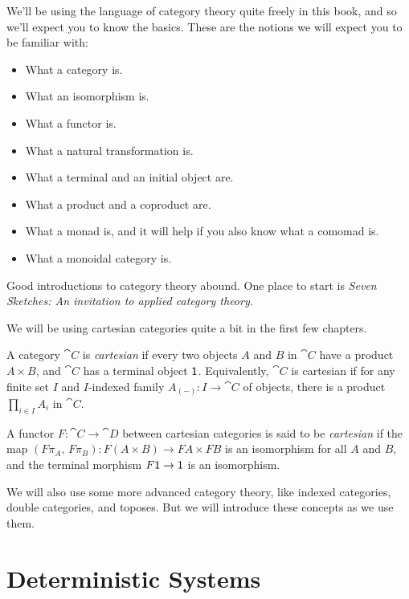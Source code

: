 \documentclass[DynamicalBook]{subfiles}
\begin{document}
We'll be using the language of category theory quite freely in this book, and so
we'll expect you to know the basics. These are the notions we will expect you to
be familiar with:
\begin{itemize}
\item What a category is.
\item What an isomorphism is.
\item What a functor is.
\item What a natural transformation is.
\item What a terminal and an initial object are.
\item What a product and a coproduct are.
\item What a monad is, and it will help if you also know what a comomad is.
  \item What a monoidal category is.
\end{itemize}

Good introductions to category theory abound. One place to start is \emph{Seven
  Sketches: An invitation to applied category theory}.

We will be using cartesian categories quite a bit in the first few chapters.
\begin{definition}\label{def.cartesian_category}
  A category $\cat{C}$ is \emph{cartesian} if every two objects $A$ and $B$ in
  $\cat{C}$ have a product $A \times B$, and $\cat{C}$ has a terminal object
  $\mathsf{1}$. Equivalently, $\cat{C}$ is cartesian if for any finite set $I$ and
  $I$-indexed family $A_{(-)} : I \to \cat{C}$ of objects, there is a product
  $\prod_{i \in I} A_i$ in $\cat{C}$.

  A functor $F : \cat{C} \to \cat{D}$ between cartesian categories is said to be
  \emph{cartesian} if the
  map $(F\pi_A,\, F\pi_B) : F(A \times B) \to FA \times FB$ is an isomorphism
  for all $A$ and $B$, and the terminal morphism $F\mathsf{1} \to \mathsf{1}$ is an
  isomorphism. 
\end{definition}

We will also use some more advanced category theory, like indexed
categories, double categories, and toposes. But we will introduce these concepts
as we use them.
\section{Deterministic Systems}
\end{document}
